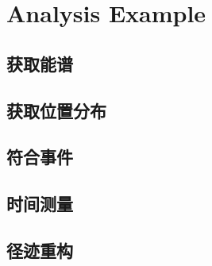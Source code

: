 \documentclass{article}
\begin{document}
\section{Analysis Example}
\subsection{获取能谱}
\subsection{获取位置分布}
\subsection{符合事件}
\subsection{时间测量}
\subsection{径迹重构}
\end{document}
